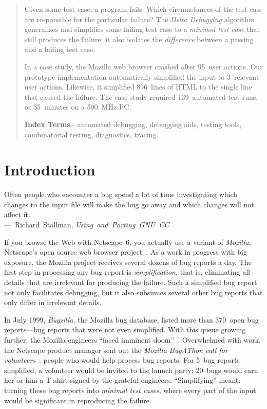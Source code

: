 \documentclass{acm_proc_article-sp}
\newcommand{\GNUCC}      {{\small GNU~CC}\xspace}
\newenvironment{Quote}{%
\smallskip
\begin{minipage}[t]{\columnwidth}
\begin{flushright}%
\itshape%
\samepage%
}{\end{flushright}\end{minipage}\par}
\newcommand{\By}[2]{\\[1mm]---~\mbox{\textnormal{#1}} \mbox{\textsl{#2}}}
\theoremstyle{plain}
\begin{document}
\begin{abstract}
  Given some test case, a program fails.  Which circumstances of the
  test case are responsible for the particular failure?  The
  \emph{Delta Debugging} algorithm generalizes and simplifies some
  failing test case to a \emph{minimal test case} that still produces
  the failure; it also isolates the \emph{difference} between a
  passing and a failing test case.

  In a case study, the Mozilla web browser crashed after 95~user
  actions.  Our prototype implementation automatically simplified the
  input to 3~relevant user actions.  Likewise, it simplified 896~lines
  of HTML to the single line that caused the failure.  The case study
  required 139~automated test runs, or 35~minutes on a 500~MHz PC.

\textbf{Index Terms}---automated debugging, debugging aids, 
testing tools, combinatorial testing, diagnostics, tracing.
\end{abstract}

\section{Introduction}
\label{sec:introduction}
\begin{Quote}
  Often people who encounter a bug spend a lot of time investigating
  which changes to the input file will make the bug go away and which
  changes will not affect it.
  \By{Richard Stallman,}{Using and Porting \GNUCC}
\end{Quote}

\noindent
If you browse the Web with Netscape~6, you actually use a variant of
\emph{Mozilla}, Netscape's open source web browser
project~\cite{mozilla.org}.  As a work in progress with big exposure,
the Mozilla project receives several dozens of bug reports a day.  The
first step in processing any bug report is \emph{simplification,} that
is, eliminating all details that are irrelevant for producing the
failure.  Such a simplified bug report not only facilitates debugging,
but it also subsumes several other bug reports that only differ in
irrelevant details.

In July 1999, \emph{Bugzilla,} the Mozilla bug database, listed more
than 370~open bug reports---bug reports that were not even simplified.
With this queue growing further, the Mozilla engineers ``faced
imminent doom''~\cite{mozilla.org/bugathon}.  Overwhelmed with work,
the Netscape product manager sent out the \emph{Mozilla BugAThon call
  for volunteers}~\cite{mozilla.org/bugathon}: people who would help
process bug reports. For 5~bug reports simplified, a volunteer would
be invited to the launch party; 20~bugs would earn her or him a
T-shirt signed by the grateful engineers.  ``Simplifying'' meant:
turning these bug reports into \emph{minimal test cases}, where every
part of the input would be significant in reproducing the failure.
\end{document}
